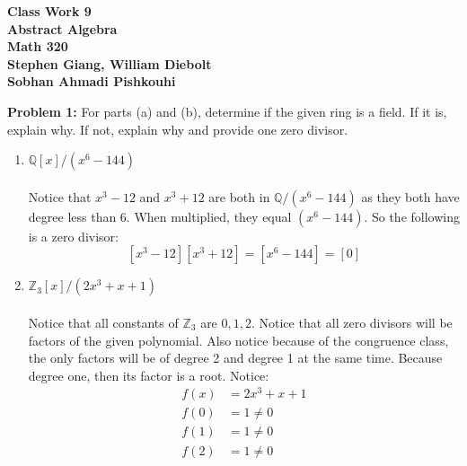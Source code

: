 \documentclass[12pt]{article}
\begin{document}
	
	\begin{center}
		\textbf{Class Work 9} \\
		\textbf{Abstract Algebra} \\
		\textbf{Math 320} \\
		\textbf{Stephen Giang, William Diebolt} \\
		\textbf{Sobhan Ahmadi Pishkouhi}
	\end{center}

\noindent \textbf{Problem 1: }For parts (a) and (b), determine if the given ring is a field. If it is, explain
why. If not, explain why and provide one zero divisor.

	\begin{enumerate}[label = (\alph*)]
		\item $\mathbb{Q}[x]/(x^6 - 144)$ 
		\\ \\
		Notice that $x^3 - 12$ and $x^3 + 12$ are both in $\mathbb{Q}/(x^6 - 144)$ as they both have degree less than $6$.  When multiplied, they equal $(x^6 - 144)$.  So the following is a zero divisor:
			$$
			[x^3 - 12][x^3 + 12] = [x^6 - 144] = [0]
			$$
		\item $\mathbb{Z}_3[x]/(2x^3 + x + 1)$
		\\ \\
		Notice that all constants of $\mathbb{Z}_3$ are $0,1,2$. Notice that all zero divisors will be factors of the given polynomial. Also notice because of the congruence class, the only factors will be of degree 2 and degree 1 at the same time.  Because degree one, then its factor is a root.  Notice:	
			\begin{align*}
				f(x) &= 2x^3 + x + 1 \\
				f(0) &= 1 \not = 0 \\
				f(1) &= 1 \not = 0 \\
				f(2) &= 1 \not = 0
			\end{align*}
	\end{enumerate}

\newpage 
\end{document}
